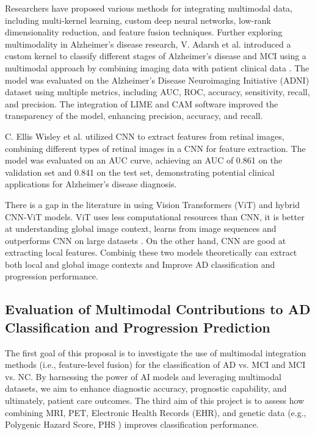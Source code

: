 Researchers have proposed various methods for integrating multimodal data, including multi-kernel learning, custom deep neural networks, low-rank dimensionality reduction, and feature fusion techniques. Further exploring multimodality in Alzheimer's disease research, V. Adarsh et al. introduced a custom kernel to classify different stages of Alzheimer’s disease and MCI using a multimodal approach by combining imaging data with patient clinical data \cite{adarsh_multimodal_2024}. The model was evaluated on the Alzheimer’s Disease Neuroimaging Initiative (ADNI) dataset using multiple metrics, including AUC, ROC, accuracy, sensitivity, recall, and precision. The integration of LIME and CAM software improved the transparency of the model, enhancing precision, accuracy, and recall.

C. Ellis Wisley et al. \cite{wisely_convolutional_2022}utilized CNN to extract features from retinal images, combining different types of retinal images in a CNN for feature extraction. The model was evaluated on an AUC curve, achieving an AUC of 0.861 on the validation set and 0.841 on the test set, demonstrating potential clinical applications for Alzheimer's disease diagnosis. 

There is a gap in the literature in using Vision Transformers (ViT) and hybrid CNN-ViT models. ViT uses less computational resources than CNN, it is better at understanding global image context, learns from image sequences and outperforms CNN on large datasets \cite{dosovitskiy_image_2021}. On the other hand, CNN are good at extracting local features. Combinig these two models theoretically can extract both local and global image contexts and Improve AD classification and progression performance. 

\subsection{Evaluation of Multimodal Contributions to AD Classification and Progression Prediction}
The first goal of this proposal is to investigate the use of multimodal integration methods (i.e., feature-level fusion) for the classification of AD vs. MCI and MCI vs. NC. By harnessing the power of AI models and leveraging multimodal datasets, we aim to enhance diagnostic accuracy, prognostic capability, and ultimately, patient care outcomes. The third aim of this project is to assess how combining MRI, PET, Electronic Health Records (EHR), and genetic data (e.g., Polygenic Hazard Score, PHS \cite{desikan_genetic_2017}) improves classification performance.

